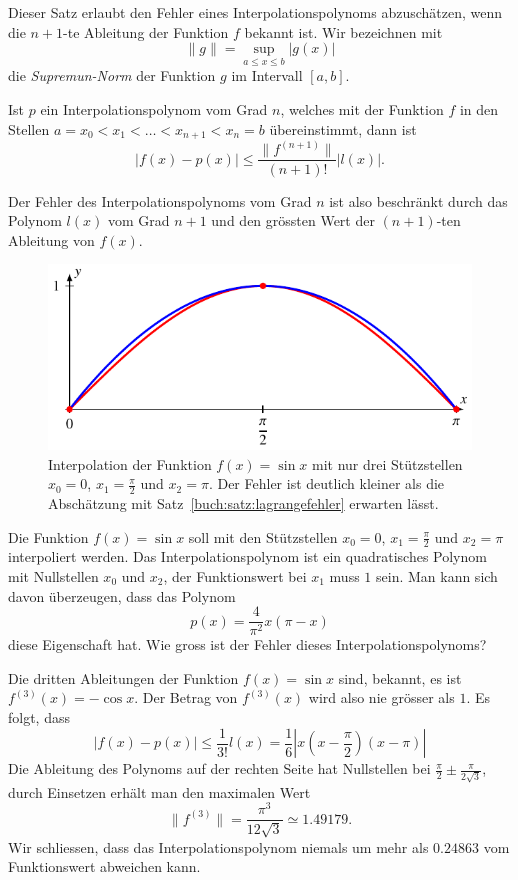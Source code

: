 Dieser Satz erlaubt den Fehler eines Interpolationspolynoms abzuschätzen,
wenn die $n+1$-te Ableitung der Funktion $f$ bekannt ist.
Wir bezeichnen mit
\[
\|g\| = \sup_{a\le x\le b} |g(x)|
\]
die {\em Supremun-Norm} der Funktion $g$ im Intervall $[a,b]$.

\begin{korollar}
\label{buch:korollar:interpolationsfehler}
Ist $p$ ein Interpolationspolynom vom Grad $n$, welches mit der Funktion
$f$ in den Stellen $a=x_0<x_1<\dots <x_{n+1}<x_n=b$ übereinstimmt, dann
ist 
\[
|f(x)-p(x)| \le \frac{\|f^{(n+1)}\|}{(n+1)!} |l(x)|.
\]
\end{korollar}

Der Fehler des Interpolationspolynoms vom Grad $n$ ist also beschränkt
durch das Polynom $l(x)$ vom Grad $n+1$ und den grössten Wert der
$(n+1)$-ten Ableitung von $f(x)$.

\begin{beispiel}
\begin{figure}
\centering
\includegraphics{chapters/30-interpolation/figures/sin.pdf}
\caption{Interpolation der Funktion $f(x)=\sin x$ mit nur drei 
Stützstellen $x_0=0$, $x_1=\frac{\pi}2$ und $x_2=\pi$.
Der Fehler ist deutlich kleiner als die Abschätzung mit
Satz~\ref{buch:satz:lagrangefehler} erwarten lässt.
\label{buch:figure:sin}}
\end{figure}
Die Funktion $f(x)=\sin x$ soll mit den Stützstellen $x_0=0$, $x_1=\frac{\pi}2$
und $x_2=\pi$ interpoliert werden.
Das Interpolationspolynom ist ein quadratisches Polynom mit Nullstellen
$x_0$ und $x_2$, der Funktionswert bei $x_1$ muss $1$ sein.
Man kann sich davon überzeugen, dass das Polynom
\[
p(x) = \frac{4}{\pi^2} x(\pi -x )
\]
diese Eigenschaft hat.
Wie gross ist der Fehler dieses Interpolationspolynoms?

Die dritten Ableitungen der Funktion $f(x)=\sin x$ sind, bekannt, es ist
$f^{(3)}(x)=-\cos x$.
Der Betrag von $f^{(3)}(x)$ wird also nie grösser als $1$.
Es folgt, dass
\[
|f(x)-p(x)| \le \frac{1}{3!} l(x)
=
\frac16 |x(x-{\textstyle\frac{\pi}2})(x-\pi)|
\]
Die Ableitung des Polynoms auf der rechten Seite hat Nullstellen bei
$\frac{\pi}2 \pm \frac{\pi}{2\sqrt{3}}$,
durch Einsetzen erhält man den maximalen Wert
\[
\|f^{(3)}\|
=
\frac{\pi^3}{12\sqrt{3}}\simeq 1.49179.
\]
Wir schliessen, dass das Interpolationspolynom niemals um mehr als $0.24863$
vom Funktionswert abweichen kann.
\end{beispiel}

